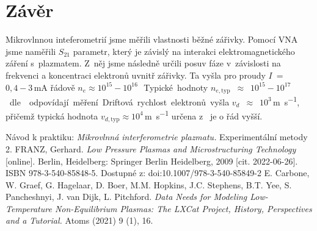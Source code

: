 \documentclass[a4paper,12pt]{article}
\begin{document}
\section{Závěr}
\par Mikrovlnnou inteferometrií jsme měřili vlastnosti běžné zářivky. Pomocí 
VNA jsme na\-mě\-ři\-li $S_{21}$ parametr, který je závislý na interakci 
elektromagnetického záření s~plazmatem. Z~něj jsme následně určili posuv 
fáze v~závislosti na frekvenci a koncentraci elektronů uvnitř zářivky. Ta 
vyšla pro proudy $I$~=~$0,4-3$\,\si{\milli\ampere} řádově $n_e \approx 
10^{15}-10^{16}$\,\si{\cubic\per\meter}. Typické 
hodnoty $n_{e,\text{typ}}$~$\approx$~$10^{15}-10^{17}$\,\si{\cubic\per\meter} 
dle 
\cite{conc} odpovídají měření. Driftová rychlost elektronů vyšla 
$v_{d}$~$\approx$~$10^3$\,\si{\meter\per\second}, přičemž typická hodnota 
$v_{d,\text{typ}} \approx 
10^4$\,\si{\meter\per\second} určena z~\cite{lxcat} je o řád vyšší.

\begin{thebibliography}{10}
	Návod k praktiku: \textit{Mikrovlnná interferometrie plazmatu.} 
	Experimentální metody 2.
	FRANZ, Gerhard. \textit{Low Pressure Plasmas and Microstructuring 
	Technology} 
	[online]. Berlin, Heidelberg: Springer Berlin Heidelberg, 2009 [cit. 
	2022-06-26]. ISBN 978-3-540-85848-5. Dostupné z: 
	doi:10.1007/978-3-540-85849-2
	E. Carbone, W. Graef, G. Hagelaar, D. Boer, M.M. Hopkins, J.C. Stephens, 
	B.T. Yee, S. Pancheshnyi, J. van Dijk, L. Pitchford. \textit{Data Needs for 
	Modeling Low-Temperature Non-Equilibrium Plasmas: The LXCat Project, 
	History, Perspectives and a Tutorial.} Atoms (2021) 9 (1), 16.
\end{thebibliography}
\end{document}
